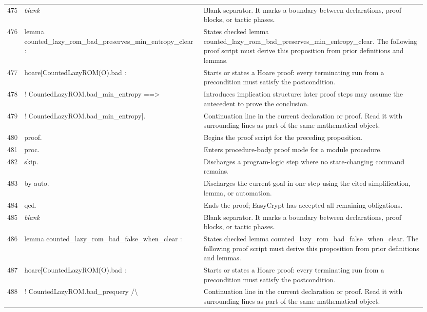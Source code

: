 \documentclass[10pt]{article}
\begin{document}
\begin{longtable}{r L{0.53\textwidth} L{0.37\textwidth}}
475 & {\ttfamily\scriptsize \emph{blank}} & Blank separator.  It marks a boundary between declarations, proof blocks, or tactic phases. \\
476 & {\ttfamily\scriptsize lemma counted\_lazy\_rom\_bad\_preserves\_min\_entropy\_clear :} & States checked lemma counted\_lazy\_rom\_bad\_preserves\_min\_entropy\_clear.  The following proof script must derive this proposition from prior definitions and lemmas. \\
477 & {\ttfamily\scriptsize   hoare[CountedLazyROM(O).bad :} & Starts or states a Hoare proof: every terminating run from a precondition must satisfy the postcondition. \\
478 & {\ttfamily\scriptsize     ! CountedLazyROM.bad\_min\_entropy ==>} & Introduces implication structure: later proof steps may assume the antecedent to prove the conclusion. \\
479 & {\ttfamily\scriptsize     ! CountedLazyROM.bad\_min\_entropy].} & Continuation line in the current declaration or proof.  Read it with surrounding lines as part of the same mathematical object. \\
480 & {\ttfamily\scriptsize proof.} & Begins the proof script for the preceding proposition. \\
481 & {\ttfamily\scriptsize proc.} & Enters procedure-body proof mode for a module procedure. \\
482 & {\ttfamily\scriptsize skip.} & Discharges a program-logic step where no state-changing command remains. \\
483 & {\ttfamily\scriptsize by auto.} & Discharges the current goal in one step using the cited simplification, lemma, or automation. \\
484 & {\ttfamily\scriptsize qed.} & Ends the proof; EasyCrypt has accepted all remaining obligations. \\
485 & {\ttfamily\scriptsize \emph{blank}} & Blank separator.  It marks a boundary between declarations, proof blocks, or tactic phases. \\
486 & {\ttfamily\scriptsize lemma counted\_lazy\_rom\_bad\_false\_when\_clear :} & States checked lemma counted\_lazy\_rom\_bad\_false\_when\_clear.  The following proof script must derive this proposition from prior definitions and lemmas. \\
487 & {\ttfamily\scriptsize   hoare[CountedLazyROM(O).bad :} & Starts or states a Hoare proof: every terminating run from a precondition must satisfy the postcondition. \\
488 & {\ttfamily\scriptsize     ! CountedLazyROM.bad\_prequery /\textbackslash{}} & Continuation line in the current declaration or proof.  Read it with surrounding lines as part of the same mathematical object. \\

\end{longtable}
\end{document}
